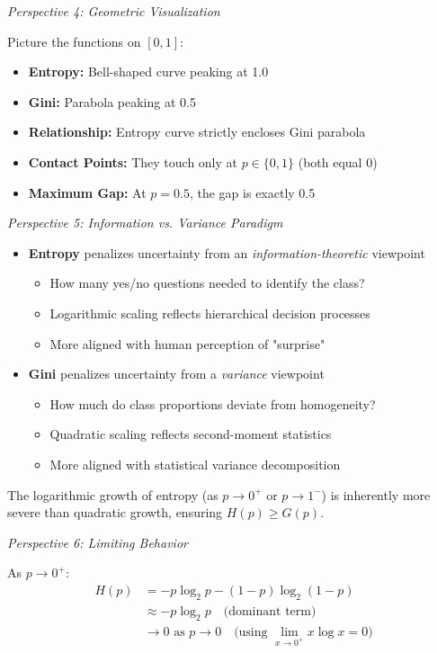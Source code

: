 \documentclass[12pt]{article}
\begin{document}
\begin{explanation}
\textit{Perspective 4: Geometric Visualization}

Picture the functions on $[0,1]$:
\begin{itemize}
    \item \textbf{Entropy:} Bell-shaped curve peaking at 1.0
    \item \textbf{Gini:} Parabola peaking at 0.5
    \item \textbf{Relationship:} Entropy curve strictly encloses Gini parabola
    \item \textbf{Contact Points:} They touch only at $p \in \{0, 1\}$ (both equal 0)
    \item \textbf{Maximum Gap:} At $p = 0.5$, the gap is exactly 0.5
\end{itemize}

\textit{Perspective 5: Information vs. Variance Paradigm}

\begin{itemize}
    \item \textbf{Entropy} penalizes uncertainty from an \textit{information-theoretic} viewpoint
    \begin{itemize}
        \item How many yes/no questions needed to identify the class?
        \item Logarithmic scaling reflects hierarchical decision processes
        \item More aligned with human perception of "surprise"
    \end{itemize}

    \item \textbf{Gini} penalizes uncertainty from a \textit{variance} viewpoint
    \begin{itemize}
        \item How much do class proportions deviate from homogeneity?
        \item Quadratic scaling reflects second-moment statistics
        \item More aligned with statistical variance decomposition
    \end{itemize}
\end{itemize}

The logarithmic growth of entropy (as $p \to 0^+$ or $p \to 1^-$) is inherently more severe than quadratic growth, ensuring $H(p) \geq G(p)$.

\textit{Perspective 6: Limiting Behavior}

As $p \to 0^+$:
\begin{align*}
H(p) &= -p\log_2 p - (1-p)\log_2(1-p) \\
&\approx -p\log_2 p \quad \text{(dominant term)} \\
&\to 0 \text{ as } p \to 0 \quad \text{(using } \lim_{x\to 0^+} x\log x = 0\text{)}
\end{align*}


\end{explanation}
\end{document}
